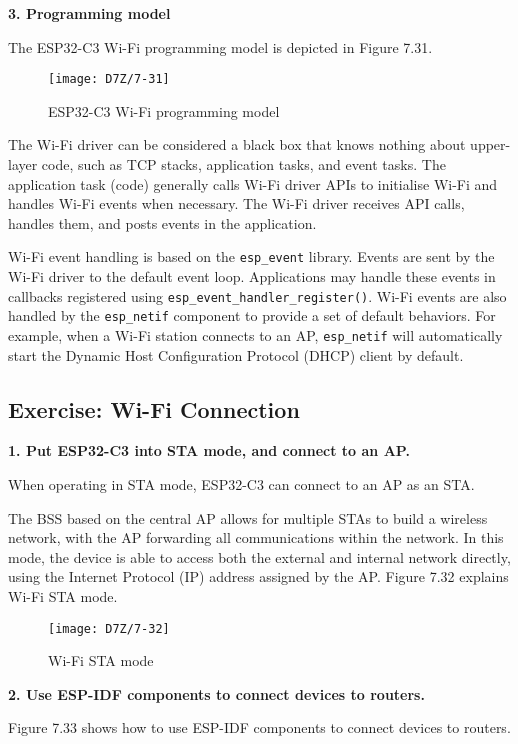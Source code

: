 \documentclass[a4paper,12pt]{book}
\begin{document}
\textbf{3. Programming model}

The ESP32-C3 Wi-Fi programming model is depicted in Figure 7.31.

\begin{figure}[!h]
    \centering
    \texttt{[image: D7Z/7-31]}
    \caption{ESP32-C3 Wi-Fi programming model}
\end{figure}

The Wi-Fi driver can be considered a black box that knows nothing about upper-layer code, such as TCP stacks, application tasks, and event tasks. The application task (code) generally calls Wi-Fi driver APIs to initialise Wi-Fi and handles Wi-Fi events when necessary. The Wi-Fi driver receives API calls, handles them, and posts events in the application.

Wi-Fi event handling is based on the \verb|esp_event| library. Events are sent by the Wi-Fi driver to the default event loop. Applications may handle these events in callbacks registered using \verb|esp_event_handler_register()|. Wi-Fi events are also handled by the \verb|esp_netif| component to provide a set of default behaviors. For example, when a Wi-Fi station connects to an AP, \verb|esp_netif| will automatically start the Dynamic Host Configuration Protocol (DHCP) client by default.

\subsection{Exercise: Wi-Fi Connection}
\textbf{1. Put ESP32-C3 into STA mode, and connect to an AP.}

When operating in STA mode, ESP32-C3 can connect to an AP as an STA. 

The BSS based on the central AP allows for multiple STAs to build a wireless network, with the AP forwarding all communications within the network. In this mode, the device is able to access both the external and internal network directly, using the Internet Protocol (IP) address assigned by the AP. Figure 7.32 explains Wi-Fi STA mode.

\begin{figure}[!h]
    \centering
    \texttt{[image: D7Z/7-32]}
    \caption{Wi-Fi STA mode}
\end{figure}

\textbf{2. Use ESP-IDF components to connect devices to routers.}

Figure 7.33 shows how to use ESP-IDF components to connect devices to routers.
\end{document}
